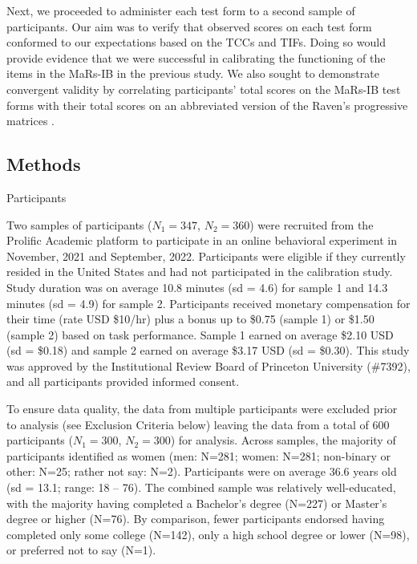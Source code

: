 \documentclass[a4paper,man,natbib]{apa6}
\makeatletter
\renewcommand{\subsubsection}{\@startsection{subsubsection}{3}
  {\z@}%
  {\b@level@two@skip}{\e@level@two@skip}%
  {\normalfont\normalsize\bfseries}}
\makeatother
\begin{document}
Next, we proceeded to administer each test form to a second sample of participants. Our aim was to verify that observed scores on each test form conformed to our expectations based on the TCCs and TIFs. Doing so would provide evidence that we were successful in calibrating the functioning of the items in the MaRs-IB in the previous study. We also sought to demonstrate convergent validity by correlating participants' total scores on the MaRs-IB test forms with their total scores on an abbreviated version of the Raven's progressive matrices \citep{bilker2012development}.

\subsection{Methods}

\subsubsection{Participants}

Two samples of participants ($N_1=347$, $N_2=360$) were recruited from the Prolific Academic platform to participate in an online behavioral experiment in November, 2021 and September, 2022. Participants were eligible if they currently resided in the United States and had not participated in the calibration study. Study duration was on average 10.8 minutes (sd = 4.6) for sample 1 and 14.3 minutes (sd = 4.9) for sample 2. Participants received monetary compensation for their time (rate USD \$10/hr) plus a bonus up to \$0.75 (sample 1) or \$1.50 (sample 2) based on task performance. Sample 1 earned on average \$2.10 USD (sd = \$0.18) and sample 2 earned on average \$3.17 USD (sd = \$0.30). This study was approved by the Institutional Review Board of Princeton University (\#7392), and all participants provided informed consent. 

To ensure data quality, the data from multiple participants were excluded prior to analysis (see Exclusion Criteria below) leaving the data from a total of 600 participants ($N_1=300$, $N_2=300$) for analysis. Across samples, the majority of participants identified as women (men: N=281; women: N=281; non-binary or other: N=25; rather not say: N=2). Participants were on average 36.6 years old (sd = 13.1; range: 18 -- 76). The combined sample was relatively well-educated, with the majority having completed a Bachelor's degree (N=227) or Master's degree or higher (N=76). By comparison, fewer participants endorsed having completed only some college (N=142), only a high school degree or lower (N=98), or preferred not to say (N=1). 
\end{document}
